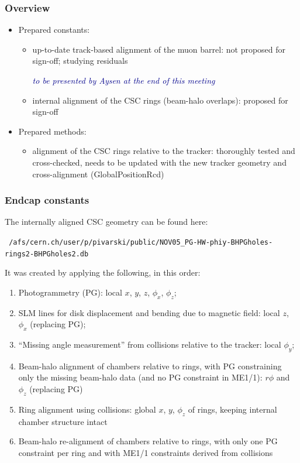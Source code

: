 \documentclass[compress]{beamer}
\begin{document}
\begin{frame}
\frametitle{Overview}
\begin{itemize}
\item Prepared constants:
\begin{itemize}
\item up-to-date track-based alignment of the muon barrel: not proposed for sign-off; studying residuals

\textcolor{darkblue}{\it to be presented by Aysen at the end of this meeting}

\vspace{0.5 cm}
\item internal alignment of the CSC rings (beam-halo overlaps): proposed for sign-off
\end{itemize}

\vspace{0.5 cm}
\item Prepared methods:
\begin{itemize}
\item alignment of the CSC rings relative to the tracker: thoroughly tested and cross-checked, needs to be updated with the new tracker geometry and cross-alignment (GlobalPositionRcd)
\end{itemize}
\end{itemize}
\end{frame}

\begin{frame}
\frametitle{Endcap constants}

The internally aligned CSC geometry can be found here:

{\tt \tiny \hspace{1 cm} /afs/cern.ch/user/p/pivarski/public/NOV05\_PG-HW-phiy-BHPGholes-rings2-BHPGholes2.db}

\vspace{0.2 cm}
It was created by applying the following, in this order:

\begin{enumerate}
\item Photogrammetry (PG): local $x$, $y$, $z$, $\phi_x$, $\phi_z$;
\item SLM lines for disk displacement and bending due to magnetic field: local $z$, $\phi_x$ (replacing PG);
\item ``Missing angle measurement'' from collisions relative to the
  tracker: local $\phi_y$;
\item Beam-halo alignment of chambers relative to rings, with PG
  constraining only the missing beam-halo data (and no PG constraint
  in ME1/1): $r\phi$ and $\phi_z$ (replacing PG)
\item Ring alignment using collisions: global $x$, $y$, $\phi_z$ of
  rings, keeping internal chamber structure intact
\item Beam-halo re-alignment of chambers relative to rings, with only
  one PG constraint per ring and with ME1/1 constraints derived from
  collisions
\end{enumerate}
\end{frame}
\end{document}
